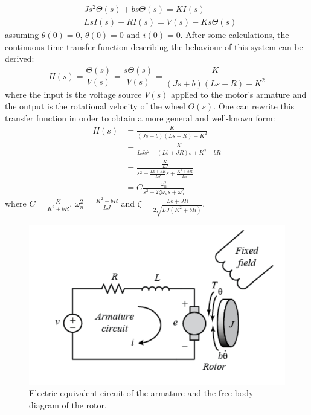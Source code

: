 \documentclass[a4paper,kul]{kulakarticle} %
\begin{document}
\begin{equation}
\begin{split}
	&Js^2\Theta(s) + bs\Theta(s) = KI(s) \\
	&LsI(s) + RI(s) = V(s) - Ks\Theta(s)	
\end{split}
\end{equation}
assuming $\theta(0) = 0$, $\dot{\theta}(0) = 0 \text{ and } i(0) = 0$. After some calculations, the continuous-time transfer function describing the behaviour of this system can be derived:
\begin{equation}
	\label{eq:TF}
    H(s) = \frac{\dot{\Theta}(s)}{V(s)} = \frac{s\Theta(s)}{V(s)} = \frac{K}{(Js + b)(Ls + R) + K^2}
\end{equation}
where the input is the voltage source $V(s)$ applied to the motor's armature and the output is the rotational velocity of the wheel  $\dot{\Theta}(s)$. One can rewrite this transfer function in order to obtain a more general and well-known form:
\begin{equation}
\label{eq:TF2}
\begin{split}
	H(s) &= \frac{K}{(Js + b)(Ls + R) + K^2} \\
	 &= \frac{K}{LJs^2 + (Lb + JR)s + K^2 + bR} \\
	 &= \frac{\frac{K}{LJ}}{s^2 + \frac{Lb + JR}{LJ}s + \frac{K^2 + bR}{LJ}} \\
	 &= C \frac{\omega_n^2}{s^2 + 2\zeta\omega_ns + \omega_n^2}
\end{split}
\end{equation}
where $C = \frac{K}{K^2 + bR}$, $\omega_n^2 = \frac{K^2 + bR}{LJ}$ and $\zeta = \frac{Lb+JR}{2\sqrt{LJ(K^2 + bR)}}$.


\begin{figure}[htp!]
    \centering
    \includegraphics[width=.6\linewidth]{DC_motors.png}
    \caption{Electric equivalent circuit of the armature and the free-body diagram of the rotor.}
    \label{fig:DCmotors}
\end{figure}
\end{document}
